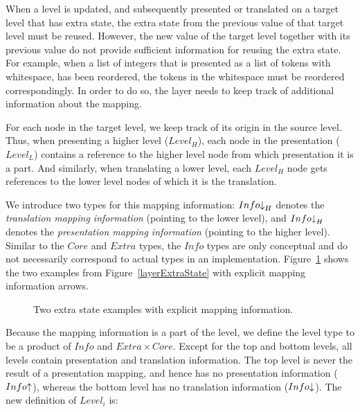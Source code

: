 When a level is updated, and subsequently presented or translated on a target level that has extra state, the extra state from the previous value of that target level must be reused. However, the new value of the target level together with its previous value do not provide sufficient information for reusing the extra state. For example, when a list of integers that is presented as a list of tokens with whitespace, has been reordered, the tokens in the whitespace must be reordered correspondingly.  In order to do so, the layer needs to keep track of additional information about the mapping.

For each node in the target level, we keep track of its origin in the source level. Thus, when presenting a higher level ($Level_{H}$), each node in the presentation ($Level_{L}$) contains a reference to the higher level node from which presentation it is a part.  And similarly, when translating a lower level, each $Level_{H}$ node gets references to the lower level nodes of which it is the translation. 

We introduce two types for this mapping information: $Info\idwn_{H}$ denotes the {\em translation mapping information}  (pointing to the lower level), and $Info\idwn_{H}$ denotes the {\em presentation mapping information} (pointing to the higher level). Similar to the $Core$ and $Extra$ types, the $Info$ types are only conceptual and do not necessarily correspond to actual types in an implementation. Figure~\ref{coreExtraInfoExamples} shows the two examples from Figure~\ref{layerExtraState} with explicit mapping information arrows. 

\begin{figure}
\begin{center}
\begin{center}
\end{center}
\caption{Two extra state examples with explicit mapping information.}\label{coreExtraInfoExamples} 
\end{center}
\end{figure}

Because the mapping information is a part of the level, we define the level type to be a product of $Info$ and 
$Extra \times Core$. Except for the top and bottom levels, all levels contain presentation and translation information. The top level is never the result of a presentation mapping, and hence has no presentation information ($Info\iup$), whereas the bottom level has no translation information ($Info\idwn$). The new definition of $Level_i$ is:


